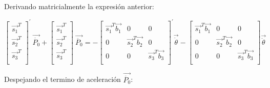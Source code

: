         Derivando matricialmente la expresión anterior:

        \begin{Center}
             \[  \left[ \begin{matrix}
            \overrightarrow{s_{1}}^{T}\\
            \overrightarrow{s_{2}}^{T}\\
            \overrightarrow{s_{3}}^{T}\\
            \end{matrix}
             \right] ^{'}~\overrightarrow{\dot{P_{0}}}+ \left[ \begin{matrix}
            \overrightarrow{s_{1}}^{T}\\
            \overrightarrow{s_{2}}^{T}\\
            \overrightarrow{s_{3}}^{T}\\
            \end{matrix}
             \right] ~\overrightarrow{\ddot{P_{0}}}=- \left[ \begin{matrix}
            \overrightarrow{s_{1}}^{T}\overrightarrow{b_{1}}  &  0  &  0\\
            0  &  \overrightarrow{s_{2}}^{T}\overrightarrow{b_{2}}  &  0\\
            0  &  0  &  \overrightarrow{s_{3}}^{T}\overrightarrow{b_{3}}\\
            \end{matrix}
             \right] ^{'}\overrightarrow{\dot{ \theta }}- \left[ \begin{matrix}
            \overrightarrow{s_{1}}^{T}\overrightarrow{b_{1}}  &  0  &  0\\
            0  &  \overrightarrow{s_{2}}^{T}\overrightarrow{b_{2}}  &  0\\
            0  &  0  &  \overrightarrow{s_{3}}^{T}\overrightarrow{b_{3}}\\
            \end{matrix}
             \right] \overrightarrow{\ddot{ \theta }} \] 
        \end{Center}
        
        Despejando el termino de aceleración   \( \overrightarrow{\ddot{P_{0}}} \):
        
